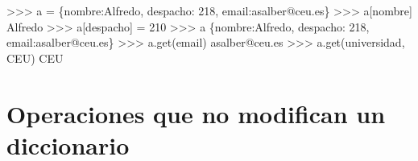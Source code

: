\documentclass[
  spanish,
  a4paper,
]{scrreport}
\newenvironment{Shaded}{\begin{snugshade}}{\end{snugshade}}
\newcommand{\CommentTok}[1]{\textcolor[rgb]{0.37,0.37,0.37}{#1}}
\newcommand{\DecValTok}[1]{\textcolor[rgb]{0.68,0.00,0.00}{#1}}
\newcommand{\NormalTok}[1]{\textcolor[rgb]{0.00,0.23,0.31}{#1}}
\newcommand{\OperatorTok}[1]{\textcolor[rgb]{0.37,0.37,0.37}{#1}}
\newcommand{\StringTok}[1]{\textcolor[rgb]{0.13,0.47,0.30}{#1}}
\begin{document}
\begin{Shaded}
\begin{Highlighting}[]
\OperatorTok{\textgreater{}\textgreater{}\textgreater{}}\NormalTok{ a }\OperatorTok{=}\NormalTok{ \{}\StringTok{\textquotesingle{}nombre\textquotesingle{}}\NormalTok{:}\StringTok{\textquotesingle{}Alfredo\textquotesingle{}}\NormalTok{, }\StringTok{\textquotesingle{}despacho\textquotesingle{}}\NormalTok{: }\DecValTok{218}\NormalTok{, }\StringTok{\textquotesingle{}email\textquotesingle{}}\NormalTok{:}\StringTok{\textquotesingle{}asalber@ceu.es\textquotesingle{}}\NormalTok{\}}
\OperatorTok{\textgreater{}\textgreater{}\textgreater{}}\NormalTok{ a[}\StringTok{\textquotesingle{}nombre\textquotesingle{}}\NormalTok{]}
\CommentTok{\textquotesingle{}Alfredo\textquotesingle{}}
\OperatorTok{\textgreater{}\textgreater{}\textgreater{}}\NormalTok{ a[}\StringTok{\textquotesingle{}despacho\textquotesingle{}}\NormalTok{] }\OperatorTok{=} \DecValTok{210}
\OperatorTok{\textgreater{}\textgreater{}\textgreater{}}\NormalTok{ a}
\NormalTok{\{}\StringTok{\textquotesingle{}nombre\textquotesingle{}}\NormalTok{:}\StringTok{\textquotesingle{}Alfredo\textquotesingle{}}\NormalTok{, }\StringTok{\textquotesingle{}despacho\textquotesingle{}}\NormalTok{: }\DecValTok{218}\NormalTok{, }\StringTok{\textquotesingle{}email\textquotesingle{}}\NormalTok{:}\StringTok{\textquotesingle{}asalber@ceu.es\textquotesingle{}}\NormalTok{\}}
\OperatorTok{\textgreater{}\textgreater{}\textgreater{}}\NormalTok{ a.get(}\StringTok{\textquotesingle{}email\textquotesingle{}}\NormalTok{)}
\CommentTok{\textquotesingle{}asalber@ceu.es\textquotesingle{}}
\OperatorTok{\textgreater{}\textgreater{}\textgreater{}}\NormalTok{ a.get(}\StringTok{\textquotesingle{}universidad\textquotesingle{}}\NormalTok{, }\StringTok{\textquotesingle{}CEU\textquotesingle{}}\NormalTok{)}
\CommentTok{\textquotesingle{}CEU\textquotesingle{}}
\end{Highlighting}
\end{Shaded}

\section{Operaciones que no modifican un
diccionario}\label{operaciones-que-no-modifican-un-diccionario}
\end{document}
